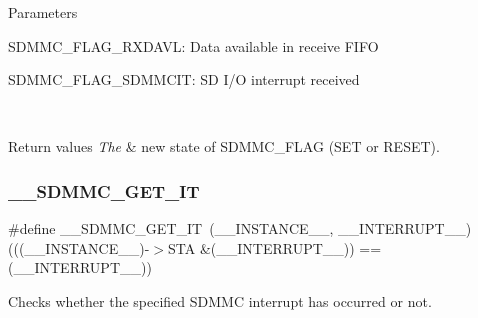\begin{DoxyParams}{Parameters}
\begin{DoxyItemize}
S\+D\+M\+M\+C\+\_\+\+F\+L\+A\+G\+\_\+\+R\+X\+D\+A\+VL\+: Data available in receive F\+I\+FO \item S\+D\+M\+M\+C\+\_\+\+F\+L\+A\+G\+\_\+\+S\+D\+M\+M\+C\+IT\+: SD I/O interrupt received \end{DoxyItemize}
\\
\hline
\end{DoxyParams}

\begin{DoxyRetVals}{Return values}
{\em The} & new state of S\+D\+M\+M\+C\+\_\+\+F\+L\+AG (S\+ET or R\+E\+S\+ET). \\
\hline
\end{DoxyRetVals}
\mbox{\label{group___s_d_m_m_c___l_l___interrupt___clock_gaf2f7410908e86bd0a59f398f7a52ea1c}} 
\subsubsection{\texorpdfstring{\_\_SDMMC\_GET\_IT}{\_\_SDMMC\_GET\_IT}}
{\footnotesize\ttfamily \#define \+\_\+\+\_\+\+S\+D\+M\+M\+C\+\_\+\+G\+E\+T\+\_\+\+IT~(\+\_\+\+\_\+\+I\+N\+S\+T\+A\+N\+C\+E\+\_\+\+\_\+, \+\_\+\+\_\+\+I\+N\+T\+E\+R\+R\+U\+P\+T\+\_\+\+\_\+)  (((\+\_\+\+\_\+\+I\+N\+S\+T\+A\+N\+C\+E\+\_\+\+\_\+)-\/$>$S\+TA \&(\+\_\+\+\_\+\+I\+N\+T\+E\+R\+R\+U\+P\+T\+\_\+\+\_\+)) == (\+\_\+\+\_\+\+I\+N\+T\+E\+R\+R\+U\+P\+T\+\_\+\+\_\+))}



Checks whether the specified S\+D\+M\+MC interrupt has occurred or not. 


